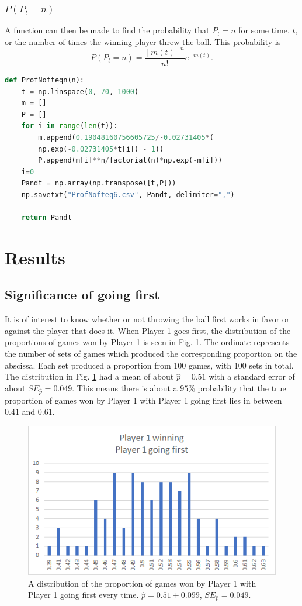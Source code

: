 \documentclass{article}
\begin{document}
\subsubsection{$P(P_t = n)$}
A function can then be made to find the probability that $P_t = n$ for some time, $t$, or the number of times the winning player threw the ball. This probability is \cite{geeks4geeeks}
\begin{equation}\label{pr}
P(P_t = n) = \frac{[m(t)]^n}{n!}e^{-m(t)}.
\end{equation}
\begin{lstlisting}[language=Python]
def ProfNofteqn(n):
    t = np.linspace(0, 70, 1000)
    m = []
    P = []
    for i in range(len(t)):
        m.append(0.19048160756605725/-0.02731405*(
        np.exp(-0.02731405*t[i]) - 1))
        P.append(m[i]**n/factorial(n)*np.exp(-m[i]))
    i=0
    Pandt = np.array(np.transpose([t,P]))
    np.savetxt("ProfNofteq6.csv", Pandt, delimiter=",")

    return Pandt
\end{lstlisting}
\section{Results}
\subsection{Significance of going first}
It is of interest to know whether or not throwing the ball first works in favor or against the player that does it. When Player 1 goes first, the distribution of the proportions of games won by Player 1 is seen in Fig. \ref{1wins1goesfirst}. The ordinate represents the number of sets of games which produced the corresponding proportion on the abscissa. Each set produced a proportion from 100 games, with 100 sets in total. The distribution in Fig. \ref{1wins1goesfirst} had a mean of about $\hat{p} = 0.51$ with a standard error of about $SE_{\hat{p}} = 0.049$. This means there is about a $95\%$ probability that the true proportion of games won by Player 1 with Player 1 going first lies in between $0.41$ and $0.61$.
\begin{figure}
	\centering
	\includegraphics[width=0.7\linewidth]{1wins1goesfirst}
	\caption{A distribution of the proportion of games won by Player 1 with Player 1 going first every time. $\hat{p} = 0.51 \pm 0.099$, $SE_{\hat{p}} = 0.049$.}
	\label{1wins1goesfirst}
\end{figure}
\end{document}
